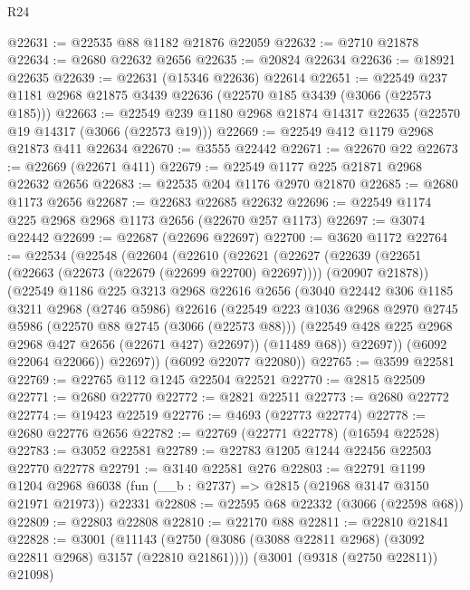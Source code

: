 \begin{lexlean}{R24}
\begin{coremodule}
@22631 := @22535 @88 @1182 @21876 @22059
@22632 := @2710 @21878
@22634 := @2680 @22632 @2656
@22635 := @20824 @22634
@22636 := @18921 @22635
@22639 := @22631 (@15346 @22636) @22614
@22651 := @22549 @237 @1181 @2968 @21875 @3439 @22636 (@22570 @185 @3439 (@3066 (@22573 @185)))
@22663 := @22549 @239 @1180 @2968 @21874 @14317 @22635 (@22570 @19 @14317 (@3066 (@22573 @19)))
@22669 := @22549 @412 @1179 @2968 @21873 @411 @22634
@22670 := @3555 @22442
@22671 := @22670 @22
@22673 := @22669 (@22671 @411)
@22679 := @22549 @1177 @225 @21871 @2968 @22632 @2656
@22683 := @22535 @204 @1176 @2970 @21870
@22685 := @2680 @1173 @2656
@22687 := @22683 @22685 @22632
@22696 := @22549 @1174 @225 @2968 @2968 @1173 @2656 (@22670 @257 @1173)
@22697 := @3074 @22442
@22699 := @22687 (@22696 @22697)
@22700 := @3620 @1172
@22764 := @22534
    (@22548
      (@22604
        (@22610
          (@22621
            (@22627
              (@22639 (@22651 (@22663 (@22673 (@22679 (@22699 @22700) @22697)))) (@20907 @21878))
              (@22549
                @1186
                @225
                @3213
                @2968
                @22616
                @2656
                (@3040
                  @22442
                  @306
                  @1185
                  @3211
                  @2968
                  (@2746 @5986)
                  @22616
                  (@22549
                    @223
                    @1036
                    @2968
                    @2970
                    @2745
                    @5986
                    (@22570 @88 @2745 (@3066 (@22573 @88)))
                    (@22549 @428 @225 @2968 @2968 @427 @2656 (@22671 @427) @22697))
                  (@11489 @68))
                @22697))
            (@6092 @22064 @22066))
          @22697))
      (@6092 @22077 @22080))
@22765 := @3599 @22581
@22769 := @22765 @112 @1245 @22504 @22521
@22770 := @2815 @22509
@22771 := @2680 @22770
@22772 := @2821 @22511
@22773 := @2680 @22772
@22774 := @19423 @22519
@22776 := @4693 (@22773 @22774)
@22778 := @2680 @22776 @2656
@22782 := @22769 (@22771 @22778) (@16594 @22528)
@22783 := @3052 @22581
@22789 := @22783 @1205 @1244 @22456 @22503 @22770 @22778
@22791 := @3140 @22581 @276
@22803 := @22791
    @1199
    @1204
    @2968
    @6038
    (fun (__b : @2737) => @2815 (@21968 @3147 @3150 @21971 @21973))
    @22331
@22808 := @22595 @68 @22332 (@3066 (@22598 @68))
@22809 := @22803 @22808
@22810 := @22170 @88
@22811 := @22810 @21841
@22828 := @3001
    (@11143 (@2750 (@3086 (@3088 @22811 @2968) (@3092 @22811 @2968) @3157 (@22810 @21861))))
    (@3001 (@9318 (@2750 @22811)) @21098)

\end{coremodule}
\end{lexlean}
